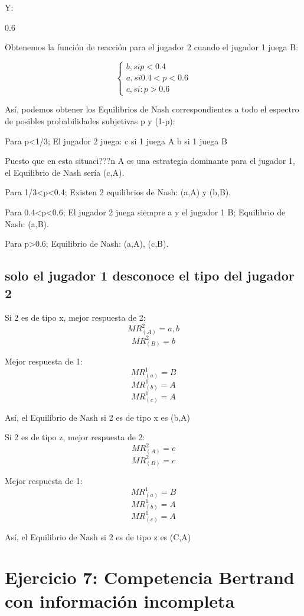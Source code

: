 \documentclass{article}
\begin{document}
Y:
\begin{Schunk}
\begin{Soutput}
[1] 0.6
\end{Soutput}
\end{Schunk}

Obtenemos la funci\'on de reacci\'on para el jugador 2 cuando el jugador 1 juega B:

$$\left\{ \begin{array}{c} b, si p<0.4 \\ a, si 0.4<p<0.6\\c, si: p>0.6\end{array}\right. $$

As\'i, podemos obtener los Equilibrios de Nash correspondientes a todo el espectro de posibles probabilidades subjetivas p y (1-p):

Para p<1/3; El jugador 2 juega:
  c si 1 juega A
  b si 1 juega B
  
Puesto que en esta situaci???n A es una estrategia dominante para el jugador 1, el Equilibrio de Nash ser\'ia (c,A).

Para 1/3<p<0.4; Existen 2 equilibrios de Nash: (a,A) y (b,B).

Para 0.4<p<0.6; El jugador 2 juega siempre a y el jugador 1 B; Equilibrio de Nash: (a,B).

Para p>0.6; Equilibrio de Nash: (a,A), (c,B).


\subsection{solo el jugador 1 desconoce el tipo del jugador 2}

Si 2 es de tipo x, mejor respuesta de 2:
$$MR^2_{(A)}=a,b$$
$$MR^2_{(B)}=b$$

Mejor respuesta de 1:
$$MR^1_{(a)}=B$$
$$MR^1_{(b)}=A$$
$$MR^1_{(c)}=A$$

As\'i, el Equilibrio de Nash si 2 es de tipo x es (b,A)


Si 2 es de tipo z, mejor respuesta de 2:
$$MR^2_{(A)}=c$$
$$MR^2_{(B)}=c$$

Mejor respuesta de 1:
$$MR^1_{(a)}=B$$
$$MR^1_{(b)}=A$$
$$MR^1_{(c)}=A$$

As\'i, el Equilibrio de Nash si 2 es de tipo z es (C,A)

\section{Ejercicio 7: Competencia Bertrand con informaci\'on incompleta}
\end{document}
